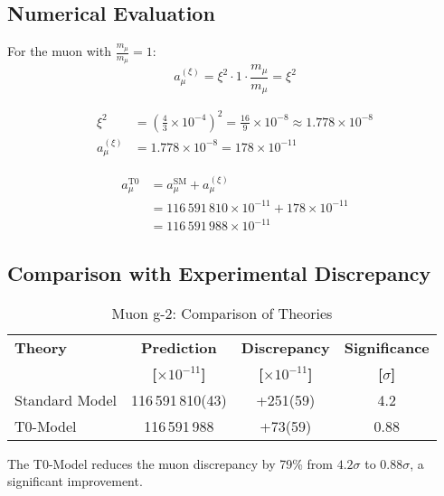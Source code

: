 \documentclass[12pt,a4paper]{article}
\newcommand{\xipar}{\xi}
\begin{document}
	\subsection{Numerical Evaluation}
	
	For the muon with \(\frac{m_\mu}{m_\mu} = 1\):
	\begin{equation}
		a_\mu^{(\xipar)} = \xipar^2 \cdot 1 \cdot \frac{m_\mu}{m_\mu} = \xipar^2
	\end{equation}
	
	\begin{align}
		\xipar^2 &= \left(\frac{4}{3} \times 10^{-4}\right)^2 = \frac{16}{9} \times 10^{-8} \approx 1.778 \times 10^{-8} \\
		a_\mu^{(\xipar)} &= 1.778 \times 10^{-8} = 178 \times 10^{-11}
	\end{align}
	
	\begin{align}
		a_\mu^{\text{T0}} &= a_\mu^{\text{SM}} + a_\mu^{(\xipar)} \\
		&= 116\,591\,810 \times 10^{-11} + 178 \times 10^{-11} \\
		&= 116\,591\,988 \times 10^{-11}
	\end{align}
	
	\subsection{Comparison with Experimental Discrepancy}
	
	\begin{table}[H]
		\centering
		\caption{Muon g-2: Comparison of Theories}
		\begin{tabular}{@{}lccc@{}}
			\toprule
			\textbf{Theory} & \textbf{Prediction} & \textbf{Discrepancy} & \textbf{Significance} \\
			& \textbf{[$\times 10^{-11}$]} & \textbf{[$\times 10^{-11}$]} & \textbf{[$\sigma$]} \\
			\midrule
			Standard Model & 116\,591\,810(43) & +251(59) & 4.2 \\
			\rowcolor{green!20}
			T0-Model & 116\,591\,988 & +73(59) & 0.88 \\
			\bottomrule
		\end{tabular}
	\end{table}
	
	\begin{success}
		The T0-Model reduces the muon discrepancy by 79\% from \(4.2\sigma\) to \(0.88\sigma\), a significant improvement.
	\end{success}
	
\end{document}
